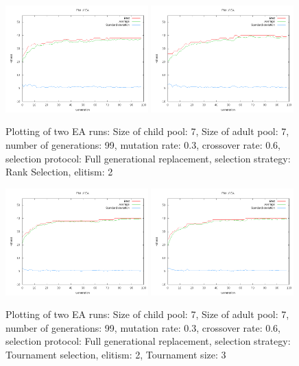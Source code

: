 \documentclass[11pt]{article}
\begin{document}
\begin{figure}[ht]
\begin{center}
\mbox{\includegraphics[width=0.49\textwidth]{images/ran1.png}}
\mbox{\includegraphics[width=0.49\textwidth]{images/ran2.png}}
\end{center}
\caption{Plotting of two EA runs:
Size of child pool: 7,
Size of adult pool: 7,
number of generations: 99,
mutation rate: 0.3,
crossover rate: 0.6,
selection protocol: Full generational replacement,
selection strategy: Rank Selection,
elitism: 2}
\label{fig:8}
\end{figure}


\begin{figure}[ht]
\begin{center}
\mbox{\includegraphics[width=0.49\textwidth]{images/tou1.png}}
\mbox{\includegraphics[width=0.49\textwidth]{images/tou2.png}}
\end{center}
\caption{Plotting of two EA runs:
Size of child pool: 7,
Size of adult pool: 7,
number of generations: 99,
mutation rate: 0.3,
crossover rate: 0.6,
selection protocol: Full generational replacement,
selection strategy: Tournament selection,
elitism: 2,
Tournament size: 3}
\label{fig:8}
\end{figure}
\end{document}
